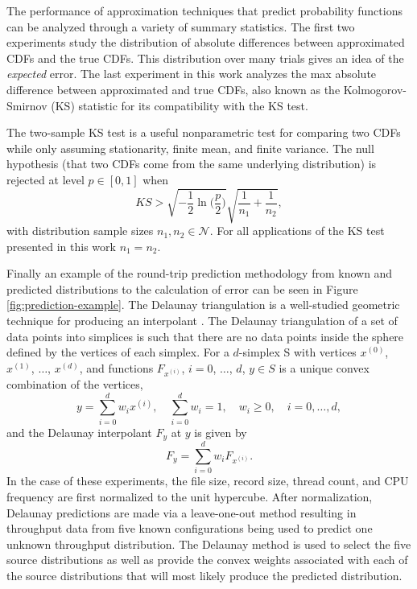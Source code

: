 \documentclass[letterpaper, 10 pt, conference]{IEEEtran}  %
\begin{document}
The performance of approximation techniques that predict probability functions can be analyzed through a variety of summary statistics. The first two experiments study the distribution of absolute differences between approximated CDFs and the true CDFs. This distribution over many trials gives an idea of the \textit{expected} error. The last experiment in this work analyzes the max absolute difference between approximated and true CDFs, also known as the Kolmogorov-Smirnov (KS) statistic \cite{lilliefors1967kolmogorov} for its compatibility with the KS test.

The two-sample KS test is a useful nonparametric test for comparing two CDFs while only assuming stationarity, finite mean, and finite variance. The null hypothesis (that two CDFs come from the same underlying distribution) is rejected at level $p \in [0,1]$ when
 $$ KS > \sqrt{-\frac{1}{2}\ln\biggl(\frac{p}{2}\biggr)} \sqrt{\frac{1}{n_1} + \frac{1}{n_2}}, $$
with distribution sample sizes $n_1,n_2 \in \mathcal{N}$. For all applications of the KS test presented in this work $n_1 = n_2$.

Finally an example of the round-trip prediction methodology from known and predicted distributions to the calculation of error can be seen in Figure \ref{fig:prediction-example}. The Delaunay triangulation is a well-studied geometric technique for producing an interpolant \cite{lee1980two}. The Delaunay triangulation of a set of data points into simplices is such that there are no data points inside the sphere defined by the vertices of each simplex. For a $d$-simplex S with vertices $x^{(0)}$, $x^{(1)}$, $\ldots$, $x^{(d)}$, and functions $F_{x^{(i)}}$, $i=0$, $\ldots$, $d$, $y \in S$ is a unique convex combination of the vertices,
$$ y = \sum_{i=0}^{d} w_i x^{(i)}, \quad \sum_{i=0}^{d} w_i = 1, \quad w_i \geq 0, \quad i=0,\ldots,d, $$
and the Delaunay interpolant $F_y$ at $y$ is given by
$$ F_y = \sum_{i=0}^{d} w_i F_{x^{(i)}}. $$
In the case of these experiments, the file size, record size, thread count, and CPU frequency are first normalized to the unit hypercube. After normalization, Delaunay predictions are made via a leave-one-out method resulting in throughput data from five known configurations being used to predict one unknown throughput distribution. The Delaunay method is used to select the five source distributions as well as provide the convex weights associated with each of the source distributions that will most likely produce the predicted distribution.
\end{document}
